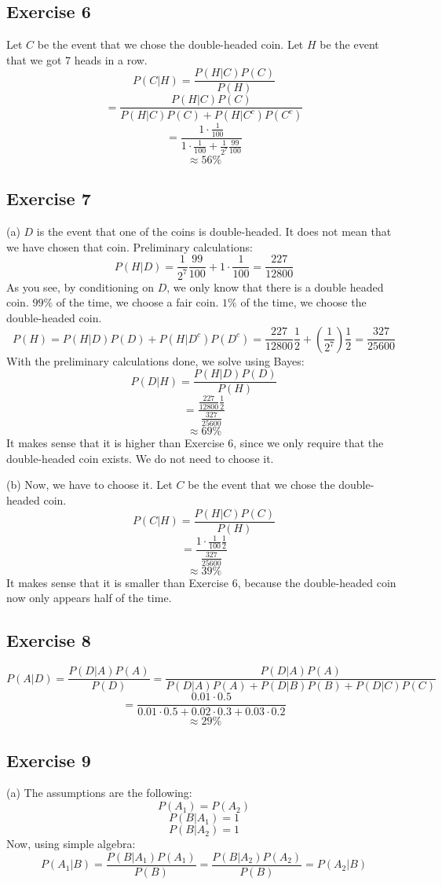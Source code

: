 \documentclass{book}
\begin{document}
\subsection*{Exercise 6}
Let $C$ be the event that we chose the double-headed coin. Let $H$ be the event that we got 7 heads in a row.
$$P(C | H) = \frac{P(H | C) P(C)}{P(H)}$$
$$= \frac{P(H | C) P(C)}{P(H | C) P(C) + P(H | C^c) P(C^c)}$$
$$= \frac{1 \cdot \frac{1}{100}}{1 \cdot \frac{1}{100} + \frac{1}{2^7} \frac{99}{100}}$$
$$\approx 56\%$$

\subsection*{Exercise 7}
(a) $D$ is the event that one of the coins is double-headed. It does not mean that we have chosen that coin. Preliminary calculations:
$$P(H | D) = \frac{1}{2^7}\frac{99}{100} + 1 \cdot \frac{1}{100} = \frac{227}{12800}$$
As you see, by conditioning on $D$, we only know that there is a double headed coin. $99\%$ of the time, we choose a fair coin. $1\%$ of the time, we choose the double-headed coin.
$$P(H) = P(H | D) P(D) + P(H | D^c) P(D^c) = \frac{227}{12800}\frac{1}{2} + \left(\frac{1}{2^7}\right)\frac{1}{2} = \frac{327}{25600}$$
With the preliminary calculations done, we solve using Bayes:
$$P(D | H) = \frac{P(H | D) P(D)}{P(H)}$$
$$= \frac{\frac{227}{12800} \frac{1}{2}}{\frac{327}{25600}}$$
$$\approx 69\%$$
It makes sense that it is higher than Exercise 6, since we only require that the double-headed coin exists. We do not need to choose it.

\noindent
(b) Now, we have to choose it. Let $C$ be the event that we chose the double-headed coin.
$$P(C | H) = \frac{P(H | C) P(C)}{P(H)}$$
$$= \frac{1 \cdot \frac{1}{100}\frac{1}{2}}{\frac{327}{25600}}$$
$$\approx 39\%$$
It makes sense that it is smaller than Exercise 6, because the double-headed coin now only appears half of the time.

\subsection*{Exercise 8}
$$P(A | D) = \frac{P(D | A) P(A)}{P(D)} = \frac{P(D | A) P(A)}{P(D | A) P(A) + P(D | B) P(B) + P(D | C) P(C)}$$
$$= \frac{0.01 \cdot 0.5}{0.01 \cdot 0.5 + 0.02 \cdot 0.3 + 0.03 \cdot 0.2}$$
$$\approx 29\%$$

\subsection*{Exercise 9}
(a) The assumptions are the following:
$$P(A_1) = P(A_2)$$
$$P(B | A_1) = 1$$
$$P(B | A_2) = 1$$
Now, using simple algebra:
$$P(A_1 | B) = \frac{P(B | A_1) P(A_1)}{P(B)} = \frac{P(B | A_2) P(A_2)}{P(B)} = P(A_2 | B)$$
\end{document}
